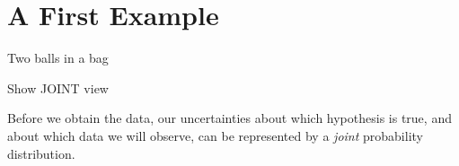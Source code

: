 \chapter{A First Example}

Two balls in a bag

Show JOINT view

Before we obtain the data, our uncertainties about which hypothesis is true,
and about which data we will observe, can be represented by a {\it joint}
probability distribution.

\begin{table}
\begin{center}
\begin{tabular}{|c|c|c|}
\hline
\hline
\end{tabular}
\end{center}
\end{table}
